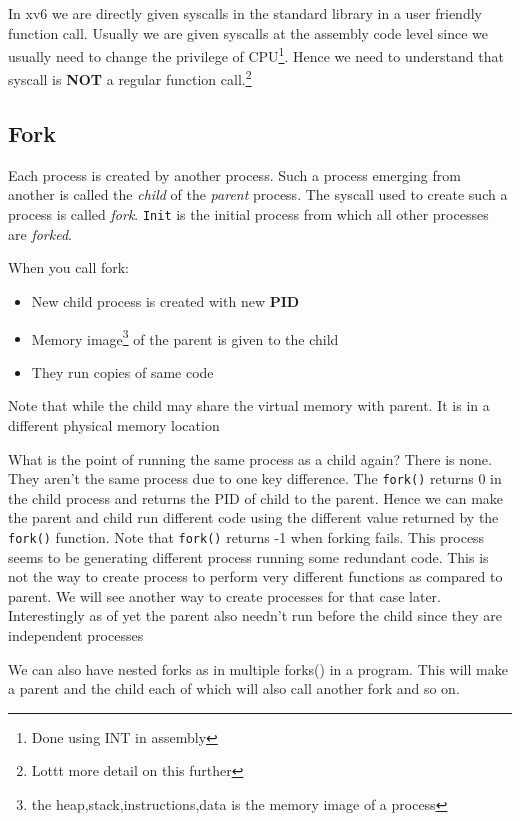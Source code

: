 \documentclass[12pt]{article}
\begin{document}
In xv6 we are directly given syscalls in the standard library in a user friendly function call. Usually we are given syscalls at the assembly code level
since we usually need to change the privilege of CPU\footnote{Done using INT in assembly}. Hence we need to understand that syscall is \textbf{NOT} a regular function call.\footnote{Lottt more detail on this further}

\subsection{Fork}
Each process is created by another process. Such a process emerging from another is called the \textit{child} of the \textit{parent} process.
The syscall used to create such a process is called \textit{fork}. \texttt{Init} is the initial process from which all other processes are \textit{forked}.

When you call fork:
\begin{itemize}[topsep=0pt, partopsep=0pt, itemsep=0pt, parsep=0pt]
    \item New child process is created with new \textbf{PID}
    \item Memory image\footnote{the heap,stack,instructions,data is the memory image of a process} of the parent is given to the child
    \item They run copies of same code
\end{itemize}
Note that while the child may share the virtual memory with parent. It is in a different physical memory location


What is the point of running the same process as a child again? There is none. They aren't the same process due to one key difference.
The \texttt{fork()} returns 0 in the child process and returns the PID of child to the parent. Hence we can make the parent and child run different code
using the different value returned by the \texttt{fork()} function. Note that \texttt{fork()} returns -1 when forking fails. This process seems to be generating different process running some redundant code.
This is not the way to create process to perform very different functions as compared to parent.
We will see another way to create processes for that case
later. Interestingly as of yet the parent also needn't run before the child since they are independent processes

We can also have nested forks as in multiple forks() in a program. This will make a parent and the child each of which will also call another fork and so on.
\end{document}
